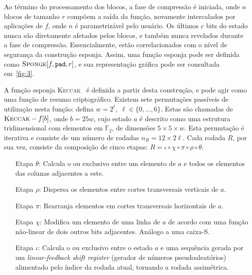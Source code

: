 \documentclass[12pt]{report}
\begin{document}
Ao término do processamento dos blocos, a fase de compressão é iniciada, onde
$n$ blocos de tamanho $r$ compõem a saída da função, novamente intercalados por
aplicações de $f$, onde $n$ é parametrizável pelo usuário. Os últimos $c$ bits
do estado nunca são diretamente afetados pelos blocos, e também nunca revelados
durante a fase de compressão. Essencialmente, estão correlacionados com o nível
de segurança da construção esponja. Assim, uma função esponja pode ser definida
como $\textsc{Sponge}[f, \texttt{pad}, r]$, e sua representação gráfica pode
ser consultada em~\ref{fig:3}.

A função esponja \textsc{Keccak}~\cite{KeccakReference} é definida a partir
desta construção, e pode agir como uma função de resumo criptográfico. Existem
sete permutações passíveis de utilização nesta função: defina $w = 2^{\ell}, \;
\ell \in \{0, \dots, 6\}$.  Estas são chamadas de $\textsc{Keccak}-f[b]$, onde
$b = 25w$, cujo estado $a$ é descrito como uma estrutura tridimensional com
elementos em $\mathbb{F}_2$, de dimensões $5 \times 5 \times w$. Esta
permutação é iterativa e consiste de um número de rodadas
$n_R = 12 \times 2 \ell$. Cada rodada $R$, por sua vez, consiste da composição
de cinco etapas: $R = \iota \circ \chi \circ \pi \circ \rho \circ \theta$.

\begin{enumerate}

  \item[Etapa $\theta$:] Calcula o ou exclusivo entre um elemento de $a$ e
      todos os elementos das colunas adjacentes a este.

  \item[Etapa $\rho$:] Dispersa os elementos entre cortes transversais
      verticais de $a$.

  \item[Etapa $\pi$:] Rearranja elementos em cortes transversais horizontais de
      $a$.

  \item[Etapa $\chi$:] Modifica um elemento de uma linha de $a$ de acordo com
      uma função não-linear de dois outros bits adjacentes. Análogo a uma
        caixa-S.

  \item[Etapa $\iota$:] Calcula o ou exclusivo entre o estado $a$ e uma
      sequência gerada por um \emph{linear-feedback shift register}
      (gerador de números pseudoaleatórios) alimentado
        pelo índice da rodada atual, tornando a rodada assimétrica.

\end{enumerate}
\end{document}
